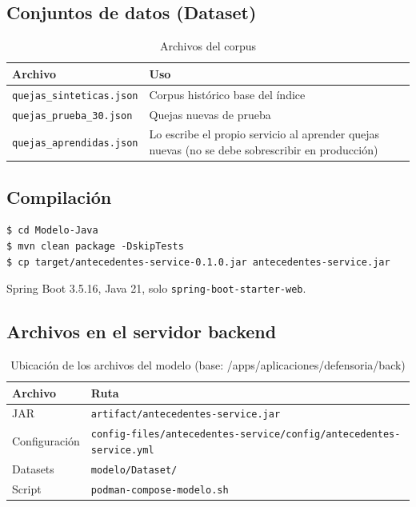 \subsection{Conjuntos de datos (Dataset)}
\begin{table}[H]
\centering
\caption{Archivos del corpus}
\begin{tabular}{lp{8.5cm}}
\toprule
\textbf{Archivo} & \textbf{Uso} \\
\midrule
\texttt{quejas\_sinteticas.json} & Corpus histórico base del índice \\
\texttt{quejas\_prueba\_30.json} & Quejas nuevas de prueba \\
\texttt{quejas\_aprendidas.json} & Lo escribe el propio servicio al aprender quejas nuevas (no se debe sobrescribir en producción) \\
\bottomrule
\end{tabular}
\end{table}

\subsection{Compilación}
\begin{lstlisting}
$ cd Modelo-Java
$ mvn clean package -DskipTests
$ cp target/antecedentes-service-0.1.0.jar antecedentes-service.jar
\end{lstlisting}
Spring Boot 3.5.16, Java 21, solo \texttt{spring-boot-starter-web}.

\subsection{Archivos en el servidor backend}
\begin{table}[H]
\centering
\caption{Ubicación de los archivos del modelo (base: /apps/aplicaciones/defensoria/back)}
\begin{tabular}{ll}
\toprule
\textbf{Archivo} & \textbf{Ruta} \\
\midrule
JAR & \texttt{artifact/antecedentes-service.jar} \\
Configuración & \texttt{config-files/antecedentes-service/config/antecedentes-service.yml} \\
Datasets & \texttt{modelo/Dataset/} \\
Script & \texttt{podman-compose-modelo.sh} \\
\bottomrule
\end{tabular}
\end{table}

